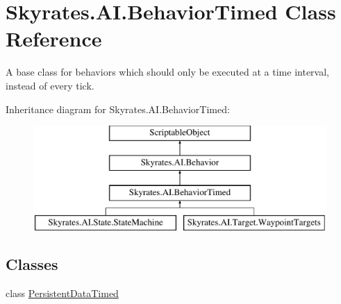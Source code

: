 \hypertarget{class_skyrates_1_1_a_i_1_1_behavior_timed}{\section{Skyrates.\-A\-I.\-Behavior\-Timed Class Reference}
\label{class_skyrates_1_1_a_i_1_1_behavior_timed}
}


A base class for behaviors which should only be executed at a time interval, instead of every tick.  


Inheritance diagram for Skyrates.\-A\-I.\-Behavior\-Timed\-:\begin{figure}[H]
\begin{center}
\leavevmode
\includegraphics[height=4.000000cm]{class_skyrates_1_1_a_i_1_1_behavior_timed}
\end{center}
\end{figure}
\subsection*{Classes}
\begin{DoxyCompactItemize}
\item 
class \hyperlink{class_skyrates_1_1_a_i_1_1_behavior_timed_1_1_persistent_data_timed}{Persistent\-Data\-Timed}
\end{DoxyCompactItemize}
